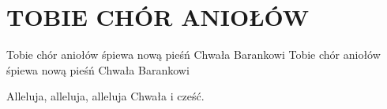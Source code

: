 \documentclass[../../../songbook.tex]{subfiles}
\begin{document}
\TabPositions{8cm} %
\section*{TOBIE CHÓR ANIOŁÓW}
{}
\vspace{0.5cm}
Tobie chór aniołów śpiewa nową pieśń	 \newline
Chwała Barankowi						 \newline
Tobie chór aniołów śpiewa nową pieśń	 \newline
Chwała Barankowi						 \newline

\-\hspace{1cm} Alleluja, alleluja, alleluja		 \newline
\-\hspace{1cm} Chwała i cześć.					 \newline
\end{document}

